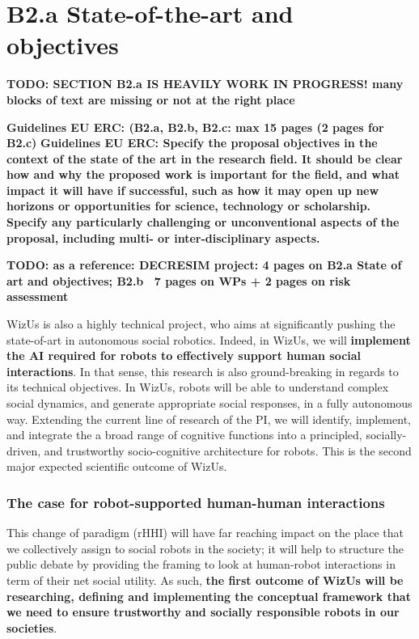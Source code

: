 \documentclass[11pt,a4paper]{report}
\newcommand{\project}{WizUs\xspace}
\newcommand{\TODO}[1]{{\color{red}\textbf{TODO: #1}}}
\newcommand{\eu}[1]{{\color{teal}\textbf{Guidelines EU ERC: #1}}}
\begin{document}
\chapter{B2.a State-of-the-art and objectives}

\TODO{SECTION B2.a IS HEAVILY WORK IN PROGRESS! many blocks of text are missing
or not at the right place}


\eu{(B2.a, B2.b, B2.c: max 15 pages (2 pages for B2.c)}
\eu{Specify the proposal objectives in the context of the state
of the art in the research field. It should be clear how and why the proposed work is important for
the field, and what impact it will have if successful, such as how it may open up new horizons or
opportunities for science, technology or scholarship. Specify any particularly challenging or
unconventional aspects of the proposal, including multi- or inter-disciplinary aspects.}

\TODO{as a reference: DECRESIM project: 4 pages on B2.a State of art and objectives; B2.b ~7 pages on WPs + 2 pages on risk assessment}


\project is also a highly technical project, who aims at significantly
pushing the state-of-art in autonomous social robotics. Indeed, in \project, we will
\textbf{implement the AI required for robots to effectively support
human social interactions}.  In that sense, this research is also
ground-breaking in regards to its technical objectives. In \project, robots will
be able to understand complex social dynamics, and generate appropriate social
responses, in a fully autonomous way.  Extending the current line of research of
the PI, we will identify, implement, and integrate the a broad range of cognitive functions into a
principled, socially-driven, and trustworthy socio-cognitive architecture for
robots. This is the second major expected scientific outcome of \project.

\subsection{The case for robot-supported human-human interactions}

This change of paradigm (rHHI) will have
far reaching impact on the place that we collectively assign to social robots in
the society; it will help to structure the public debate by providing the
framing to look at human-robot interactions in term of their net social utility.
As such, \textbf{the first outcome of \project will be researching, defining and implementing the conceptual
framework that we need to ensure trustworthy and socially responsible robots in
our societies}.
\end{document}
